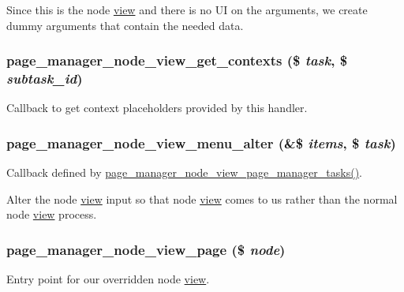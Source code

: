 Since this is the node \hyperlink{classview}{view} and there is no UI on the arguments, we create dummy arguments that contain the needed data. \hypertarget{node__view_8inc_a0eaeb501a26ea68572251645a15bcc19}{
\subsubsection[{page\_\-manager\_\-node\_\-view\_\-get\_\-contexts}]{\setlength{\rightskip}{0pt plus 5cm}page\_\-manager\_\-node\_\-view\_\-get\_\-contexts (\$ {\em task}, \/  \$ {\em subtask\_\-id})}}
\label{node__view_8inc_a0eaeb501a26ea68572251645a15bcc19}
Callback to get context placeholders provided by this handler. \hypertarget{node__view_8inc_a58c036f15927080f060f279aefcee5d6}{
\subsubsection[{page\_\-manager\_\-node\_\-view\_\-menu\_\-alter}]{\setlength{\rightskip}{0pt plus 5cm}page\_\-manager\_\-node\_\-view\_\-menu\_\-alter (\&\$ {\em items}, \/  \$ {\em task})}}
\label{node__view_8inc_a58c036f15927080f060f279aefcee5d6}
Callback defined by \hyperlink{node__view_8inc_a981d1e2a2df349abcc15a7854063d01a}{page\_\-manager\_\-node\_\-view\_\-page\_\-manager\_\-tasks()}.

Alter the node \hyperlink{classview}{view} input so that node \hyperlink{classview}{view} comes to us rather than the normal node \hyperlink{classview}{view} process. \hypertarget{node__view_8inc_adf9f4dd87820e4d5e41eb5132e693d05}{
\subsubsection[{page\_\-manager\_\-node\_\-view\_\-page}]{\setlength{\rightskip}{0pt plus 5cm}page\_\-manager\_\-node\_\-view\_\-page (\$ {\em node})}}
\label{node__view_8inc_adf9f4dd87820e4d5e41eb5132e693d05}
Entry point for our overridden node \hyperlink{classview}{view}.


